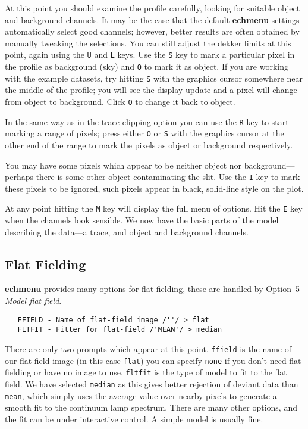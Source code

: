 \documentclass[twoside,11pt]{article}
\newcommand{\xref}[3]{#1}
\newcommand{\scspec}[2]{#1}
\newcommand{\scspec}[2]{#2}
\begin{document}
At this point you should examine the profile carefully, looking for suitable
object and background channels.  It may be the case that the default
{\bf echmenu} settings automatically select good channels; however, better
results are often obtained by manually tweaking the selections.
You can still adjust the dekker limits at this point, again using the
\verb+U+ and \verb+L+ keys.
Use the \verb+S+ key to mark a particular pixel in the profile as background
(sky) and \verb+O+ to mark it as object.  If you are working with the example
datasets, try hitting \verb+S+ with the graphics cursor somewhere near the
middle of the profile; you will see the display update and a pixel will
change from object to background.  Click \verb+O+ to change it back to
object.

In the same way as in the \xref{trace-clipping option}{sun152}{option3}
you can use the \verb+R+ key
to start marking a range of pixels; press either \verb+O+ or \verb+S+ with
the graphics cursor at the other end of the range to mark the pixels as
object or background respectively.

You may have some pixels which appear to be neither object nor
background\scspec{---}{ - }perhaps there is some other object contaminating
the slit.  Use the \verb+I+ key to mark these pixels to be ignored, such
pixels appear in black, solid-line style on the plot.

At any point hitting the \verb+M+ key will display the full menu of options.
Hit the \verb+E+ key when the channels look sensible.  We now have the basic
parts of the model describing the data\scspec{---}{ - }a trace, and object
and background channels.


\subsection{Flat Fielding}

\xref{{\bf echmenu}}{sun152}{ECHMENU}
provides many options for flat fielding, these are handled by
\xref{Option~5 {\sl Model flat field}}{sun152}{option5}.

{
\scspec{\small}{ }
\begin{verbatim}
   FFIELD - Name of flat-field image /''/ > flat
   FLTFIT - Fitter for flat-field /'MEAN'/ > median
\end{verbatim}
}

There are only two prompts which appear at this point.
\xref{{\tt{ffield}}}{sun152}{par_FFIELD} is the name of our flat-field
image (in this case \verb+flat+) you can specify
\verb+none+ if you don't need flat fielding or have no image to use.
\xref{{\tt{fltfit}}}{sun152}{par_FLTFIT} is the type of model to fit
to the flat field.
We have selected \verb+median+ as this gives better rejection of deviant
data than \verb+mean+, which simply uses the average value over nearby
pixels to generate a smooth fit to the continuum lamp spectrum.
There are many other options, and the fit can be under interactive control.
A simple model is usually fine.
\end{document}
